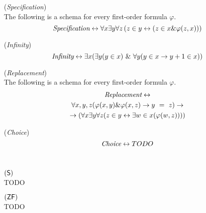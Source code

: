 \begin{definition}{(\emph{Specification})}\label{def:specification}\\
The following is a schema for every first-order formula $\varphi$.
\begin{equation}
\emph{Specification} \iff \forall x \exists y \forall z \, ( z \in y \iff ( z \in x \& \varphi(z, x)))
\end{equation}
\end{definition}

\begin{definition}{(\emph{Infinity})}\label{def:infinity}\\
\begin{equation}
\emph{Infinity} \iff \exists x (\exists y (y \in x)\ \&\ \forall y(y \in x \then y+1 \in x))
\end{equation}
\end{definition}

\begin{definition}{(\emph{Replacement})}\label{def:replacement}\\
The following is a schema for every first-order formula $\varphi$.
\begin{equation}
\begin{gathered}
\emph{Replacement} \iff\\
\forall x, y, z (\varphi(x, y) \& \varphi(x, z) \then y\ =\ z) \then \\
\then (\forall x \exists y \forall z (z \in y \iff \exists w \in x (\varphi(w, z))))
\end{gathered}
\end{equation}
\end{definition}

\begin{definition}{(\emph{Choice})}\label{def:choice}\\
\begin{equation}
\emph{Choice} \iff TODO
\end{equation}
\end{definition}

\

\begin{definition}{$(\sf{S})$}\label{def:s}\\
TODO
\end{definition}

\begin{definition}{$(\sf{ZF})$}\label{def:zf}\\
TODO
\end{definition}

